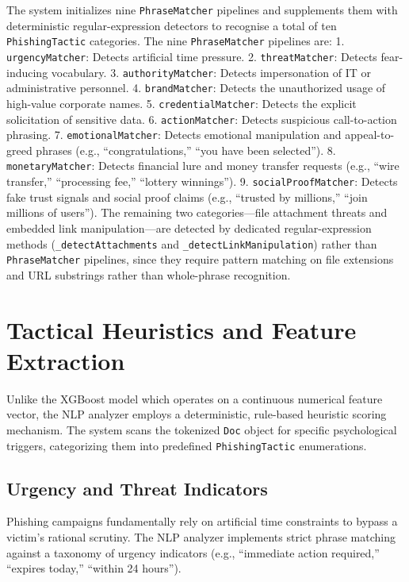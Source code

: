 The system initializes nine \texttt{PhraseMatcher} pipelines and
supplements them with deterministic regular-expression detectors to
recognise a total of ten \texttt{PhishingTactic} categories. The
nine \texttt{PhraseMatcher} pipelines are: 1.
\texttt{urgencyMatcher}: Detects artificial time pressure. 2.
\texttt{threatMatcher}: Detects fear-inducing vocabulary. 3.
\texttt{authorityMatcher}: Detects impersonation of IT or administrative
personnel. 4. \texttt{brandMatcher}: Detects the unauthorized usage of
high-value corporate names. 5. \texttt{credentialMatcher}: Detects the
explicit solicitation of sensitive data. 6. \texttt{actionMatcher}:
Detects suspicious call-to-action phrasing. 7. \texttt{emotionalMatcher}:
Detects emotional manipulation and appeal-to-greed phrases (e.g.,
``congratulations,'' ``you have been selected''). 8.
\texttt{monetaryMatcher}: Detects financial lure and money transfer
requests (e.g., ``wire transfer,'' ``processing fee,'' ``lottery
winnings''). 9. \texttt{socialProofMatcher}: Detects fake trust
signals and social proof claims (e.g., ``trusted by millions,'' ``join
millions of users''). The remaining two categories---file attachment
threats and embedded link manipulation---are detected by dedicated
regular-expression methods (\texttt{\_detectAttachments} and
\texttt{\_detectLinkManipulation}) rather than \texttt{PhraseMatcher}
pipelines, since they require pattern matching on file extensions and
URL substrings rather than whole-phrase recognition.

\section{Tactical Heuristics and Feature
Extraction}\label{tactical-heuristics-and-feature-extraction}

Unlike the XGBoost model which operates on a continuous numerical
feature vector, the NLP analyzer employs a deterministic, rule-based
heuristic scoring mechanism. The system scans the tokenized \texttt{Doc}
object for specific psychological triggers, categorizing them into
predefined \texttt{PhishingTactic} enumerations.

\subsection{Urgency and Threat
Indicators}\label{urgency-and-threat-indicators}

Phishing campaigns fundamentally rely on artificial time constraints to
bypass a victim's rational scrutiny. The NLP analyzer implements strict
phrase matching against a taxonomy of urgency indicators (e.g.,
``immediate action required,'' ``expires today,'' ``within 24 hours'').

